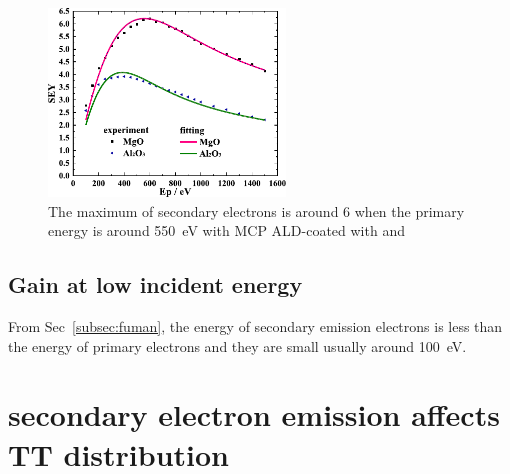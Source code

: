 \documentclass{article}
\begin{document}
\begin{figure}[ht]
    \centering
    \includegraphics[height=5cm]{pic/SEE.pdf}
    \caption{The maximum of secondary electrons is around 6 when the primary energy is around \SI{550}{eV} with MCP ALD-coated with  and }\label{fig:SEE}
\end{figure}


\subsection{Gain at low incident energy}\label{sec:gain}
From Sec~\ref{subsec:fuman}, the energy of secondary emission electrons is less than the energy of primary electrons and
they are small usually around \SI{100}{eV}.


\section{secondary electron emission affects TT distribution}\label{sec:TT}
\newpage


\end{document}
